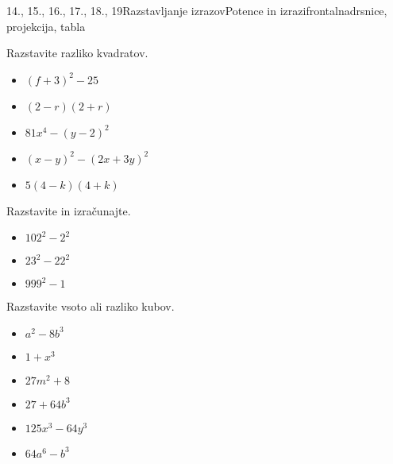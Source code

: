 \begin{priprava}{14., 15., 16., 17., 18., 19}{}{Razstavljanje izrazov}{Potence in izrazi}{frontalna}{drsnice, projekcija, tabla}
\begin{multicols}{2}
    
        
            \begin{naloga}
                Razstavite razliko kvadratov.
                \begin{itemize}
                    \item $(f+3)^2-25$ 
                    \item $(2-r)(2+r)$ 
                    \item $81x^4-(y-2)^2$ 
                    \item $(x-y)^2-(2x+3y)^2$ 
                    \item $5(4-k)(4+k)$ 
                \end{itemize}
            \end{naloga}
        
    
        
            \begin{naloga}
                Razstavite in izračunajte.
                \begin{itemize}
                    \item $102^2-2^2$  
                    \item $23^2-22^2$  
                    \item $999^2-1$ 
                \end{itemize}
            \end{naloga}
        
    
        
            \begin{naloga}
                Razstavite vsoto ali razliko kubov.
                \begin{itemize}
                    \item $a^2-8b^3$ 
                    \item $1+x^3$ 
                    \item $27m^2+8$ 
                    \item $27+64b^3$ 
                    \item $125x^3-64y^3$ 
                    \item $64a^6-b^3$ 
                \end{itemize}
            \end{naloga}
        
    
        

\end{multicols}
\end{priprava}
